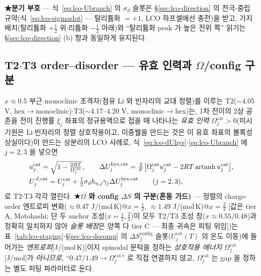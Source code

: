 \textbf{★분기 부호} --- 식~\eqref{eq:lco-Ubranch} 의 $\sigma_d$ 슬롯은 \S\ref{sec:lco-direction} 의 전극-중립
규약(식~\eqref{eq:lco-sigmaslot} --- 탈리튬화 $=+1$, LCO 하프셀에선 충전)을 받고, 가지 배치(탈리튬화
$+\tfrac12$ 위$\cdot$리튬화 $-\tfrac12$ 아래)와 ``탈리튬화 peak 가 높은 전위 쪽'' 읽기는 \S\ref{sec:lco-direction} (b)
항과 동일하게 유지된다.

\subsection{T2$\cdot$T3 order--disorder --- 유효 인력과 $\Omega$/config 구분}\label{sec:lco-hys-od}
$x\approx0.5$ 부근 monoclinic 초격자(점유 Li 와 빈자리의 교대 정렬)를 이루는 T2($\sim$4.05 V,
hex$\to$monoclinic)$\cdot$T3($\sim$4.17--4.20 V, monoclinic$\to$hex)는, 1차 전이의 2상 공존을 전이
진행률 $\xi_j$ 좌표의 정규용액으로 접을 때 나타나는 \emph{유효 인력} $\Omega_j^\mathrm{cat}>0$(미시
기원은 Li$\cdot$빈자리의 정렬 상호작용이고, 이중웰을 만드는 것은 이 유효 좌표의 볼록성 상실이다)이
만드는 상분리의 LCO 사례로, 식~\eqref{eq:lco-dUhys}$\cdot$\eqref{eq:lco-Ubranch} 에 $j=2,3$ 을 넣으면
\[
\begin{aligned}
&u_j^\mathrm{cat}=\sqrt{1-\tfrac{2RT}{\Omega_j^\mathrm{cat}}},\qquad
\Delta U_j^{\mathrm{hys},\mathrm{cat}}=\tfrac{2}{F}\big[\Omega_j^\mathrm{cat}u_j^\mathrm{cat}
-2RT\,\mathrm{artanh}\,u_j^\mathrm{cat}\big],\\
&U_j^{\,d,\mathrm{cat}}=U_j^\mathrm{cat}+\tfrac12\sigma_d h_{\eta,j}\gamma_j\Delta U_j^{\mathrm{hys},\mathrm{cat}}
\qquad(j=2,3),
\end{aligned}
\]
로 T2$\cdot$T3 각각 열린다. \textbf{★$\Omega$ 와 config $\Delta S$ 의 구분(혼동 가드)} --- 정렬의 charge-order
엔트로피 변화($\approx0.47$ J/(mol\,K)@$x{=}\tfrac12$, $\approx1.49$ J/(mol\,K)@$x{=}\tfrac23$
[값은 tier A, Motohashi\cite{motohashi2009}; 단 두 anchor 조성($x{=}\tfrac12,\tfrac23$)이 모두 T2/T3
조성 창($x\approx0.55/0.48$)과 정확히 일치하지 않아 \emph{슬롯 배정}은 양쪽 다 tier C --- 최종 귀속은 피팅
위임])는 표~\ref{tab:lco-staging}$\cdot$\S\ref{sec:lco-decomp} 의
$\Delta S_j^\mathrm{config}$ 슬롯($U_j^\mathrm{cat}(T)$ 의 온도 이동)에 들어가는 \emph{엔트로피}[J/(mol\,K)]이지
spinodal 문턱을 정하는 \emph{상호작용 에너지} $\Omega_j^\mathrm{cat}$[J/mol]가 \emph{아니므로},
``$0.47/1.49\to\Omega_j^\mathrm{cat}$'' 로 직접 연결하지 않고, $\Omega_j^\mathrm{cat}$ 는 gap 을 정하는
별도 피팅 파라미터로 둔다.

